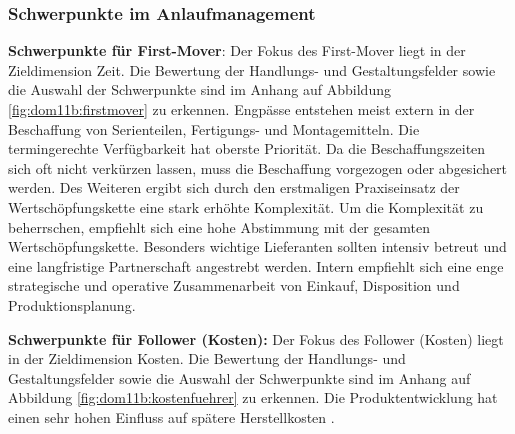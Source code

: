 \subsubsection{Schwerpunkte im Anlaufmanagement}

\textbf{Schwerpunkte für First-Mover}: Der Fokus des First-Mover liegt in der Zieldimension Zeit. 
Die Bewertung der Handlungs- und Gestaltungsfelder sowie die Auswahl der Schwerpunkte sind im Anhang auf Abbildung \ref{fig:dom11b:firstmover} zu erkennen. 
%
Engpässe entstehen meist extern in der Beschaffung von Serienteilen, Fertigungs- und Montagemitteln. Die termingerechte Verfügbarkeit hat oberste Priorität. Da die Beschaffungszeiten sich oft nicht verkürzen lassen, muss die Beschaffung vorgezogen oder abgesichert werden. 
Des Weiteren ergibt sich durch den erstmaligen Praxiseinsatz der Wertschöpfungskette eine stark erhöhte Komplexität. Um die Komplexität zu beherrschen, empfiehlt sich eine hohe Abstimmung mit der gesamten Wertschöpfungskette. 
Besonders wichtige Lieferanten sollten intensiv betreut und eine langfristige Partnerschaft angestrebt werden. 
Intern empfiehlt sich eine enge strategische und operative Zusammenarbeit von Einkauf, Disposition und Produktionsplanung. 

\textbf{Schwerpunkte für Follower (Kosten):} Der Fokus des Follower (Kosten) liegt in der Zieldimension Kosten. 
Die Bewertung der Handlungs- und Gestaltungsfelder sowie die Auswahl der Schwerpunkte sind im Anhang auf Abbildung \ref{fig:dom11b:kostenfuehrer} zu erkennen. 
%
Die Produktentwicklung hat einen sehr hohen Einfluss auf spätere Herstellkosten \autocite[14]{Ehrlenspiel2014}. 

